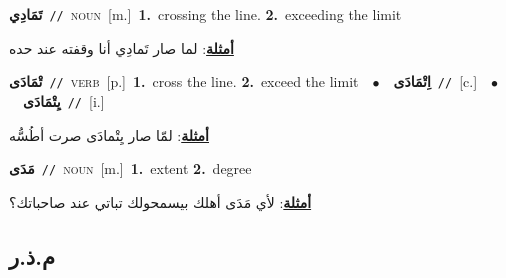 \documentclass[10pt,a4paper,twoside]{article} %
\begin{document}
\begin{multicols}{2}
{\setlength\topsep{0pt}\textbf{\foreignlanguage{arabic}{تَمَادِي}}\ {\color{gray}\texttt{//}\color{black}}\ \textsc{noun}\ [m.]\ \textbf{1.}~crossing the line.  \textbf{2.}~exceeding the limit\  \begin{flushright}\color{gray}\foreignlanguage{arabic}{\textbf{\underline{\foreignlanguage{arabic}{أمثلة}}}: لما صار تَمادِي أنا وقفته عند حده}\end{flushright}\color{black}} \vspace{2mm}

{\setlength\topsep{0pt}\textbf{\foreignlanguage{arabic}{تْمَادَى}}\ {\color{gray}\texttt{//}\color{black}}\ \textsc{verb}\ [p.]\ \textbf{1.}~cross the line.  \textbf{2.}~exceed the limit\ \ $\bullet$\ \ \setlength\topsep{0pt}\textbf{\foreignlanguage{arabic}{اِتْمَادَى}}\ {\color{gray}\texttt{//}\color{black}}\ [c.]\ \ $\bullet$\ \ \setlength\topsep{0pt}\textbf{\foreignlanguage{arabic}{يِتْمَادَى}}\ {\color{gray}\texttt{//}\color{black}}\ [i.]\  \begin{flushright}\color{gray}\foreignlanguage{arabic}{\textbf{\underline{\foreignlanguage{arabic}{أمثلة}}}: لمّا صار يِتْمادَى صرت أطُسُّه}\end{flushright}\color{black}} \vspace{2mm}

{\setlength\topsep{0pt}\textbf{\foreignlanguage{arabic}{مَدَى}}\ {\color{gray}\texttt{//}\color{black}}\ \textsc{noun}\ [m.]\ \textbf{1.}~extent  \textbf{2.}~degree\  \begin{flushright}\color{gray}\foreignlanguage{arabic}{\textbf{\underline{\foreignlanguage{arabic}{أمثلة}}}: لأي مَدَى أهلك بيسمحولك تباتي عند صاحباتك؟}\end{flushright}\color{black}} \vspace{2mm}

\vspace{-3mm}
\subsection*{\color{blue}\foreignlanguage{arabic}{م.ذ.ر}\color{blue}{}} 


\end{multicols}
\end{document}
